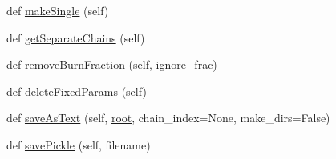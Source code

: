 \begin{DoxyCompactItemize}
\item 
def \mbox{\hyperlink{classgetdist_1_1chains_1_1Chains_abf8a89dbd2d048f01330ed93e6ea226e}{make\+Single}} (self)
\item 
def \mbox{\hyperlink{classgetdist_1_1chains_1_1Chains_a16d3828d299dda03e7ab074ae755e3fc}{get\+Separate\+Chains}} (self)
\item 
def \mbox{\hyperlink{classgetdist_1_1chains_1_1Chains_afdf14ad21843a394732184ae26433d6e}{remove\+Burn\+Fraction}} (self, ignore\+\_\+frac)
\item 
def \mbox{\hyperlink{classgetdist_1_1chains_1_1Chains_ad4e95f9abe55474a9d7a9d4245190cdd}{delete\+Fixed\+Params}} (self)
\item 
def \mbox{\hyperlink{classgetdist_1_1chains_1_1Chains_a9fdaed252edbe3a4fceb8c139b49b911}{save\+As\+Text}} (self, \mbox{\hyperlink{classgetdist_1_1chains_1_1Chains_ae8dd7bf3c841a906ae7d6b3c83326c75}{root}}, chain\+\_\+index=None, make\+\_\+dirs=False)
\item 
def \mbox{\hyperlink{classgetdist_1_1chains_1_1Chains_abf1564054c1d6e4816d4a4169eaa7d3f}{save\+Pickle}} (self, filename)
\end{DoxyCompactItemize}

